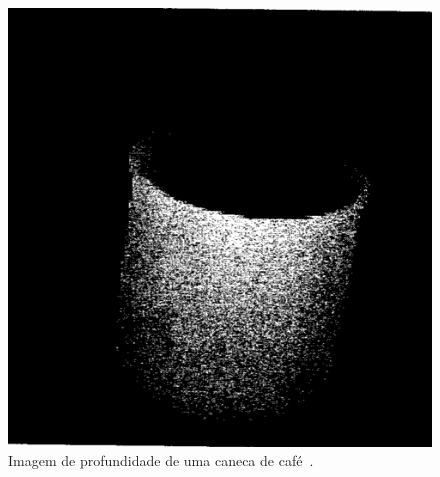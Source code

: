 	\begin{figure}[H]
		\begin{center}
			\includegraphics[scale=0.3]{figuras/2.FundamentacaoTeorica/depthimage.png}
		\end{center}
		\caption{Imagem de profundidade de uma caneca de café~\cite{jain}.}
		\label{depthimage}
	\end{figure}

